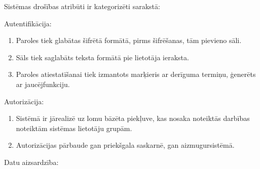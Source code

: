     
Sistēmas drošības atribūti ir kategorizēti sarakstā:
	    \item Autentifikācija:
            \begin{enumerate}
                \item Paroles tiek glabātas šifrētā formātā, pirms šifrēšanas, tām pievieno sāli.
                \item Sāls tiek saglabāts teksta formātā pie lietotāja ieraksta.
                \item Paroles atiestatīšanai tiek izmantots marķieris ar derīguma termiņu, ģenerēts ar jaucējfunkciju.
            \end{enumerate}

        \item Autorizācija:

            \begin{enumerate}
                \item Sistēmā ir jārealizē uz lomu bāzēta piekļuve, kas nosaka noteiktās darbības noteiktām sistēmas lietotāju grupām.
                \item Autorizācijas pārbaude gan priekšgala saskarnē, gan aizmugursistēmā.
            \end{enumerate}
	\item Datu aizsardzība:


